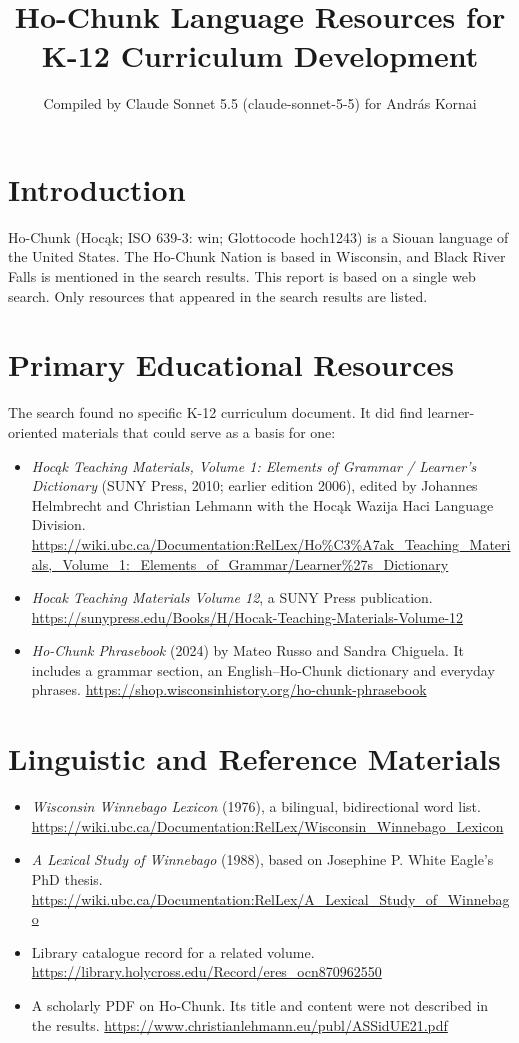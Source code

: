 \documentclass[12pt]{article}
\title{Ho-Chunk Language Resources for K-12 Curriculum Development}
\author{Compiled by Claude Sonnet 5.5 (claude-sonnet-5-5) for Andr\'as Kornai}
\date{}
\begin{document}
\maketitle

\section{Introduction}
Ho-Chunk (Hoc\k{a}k; ISO 639-3: win; Glottocode hoch1243) is a Siouan language of the United States. The Ho-Chunk Nation is based in Wisconsin, and Black River Falls is mentioned in the search results. This report is based on a single web search. Only resources that appeared in the search results are listed.

\section{Primary Educational Resources}
The search found no specific K-12 curriculum document. It did find learner-oriented materials that could serve as a basis for one:
\begin{itemize}
\item \emph{Hoc\k{a}k Teaching Materials, Volume 1: Elements of Grammar / Learner's Dictionary} (SUNY Press, 2010; earlier edition 2006), edited by Johannes Helmbrecht and Christian Lehmann with the Hoc\k{a}k Wazija Haci Language Division. \url{https://wiki.ubc.ca/Documentation:RelLex/Ho%C3%A7ak_Teaching_Materials,_Volume_1:_Elements_of_Grammar/Learner%27s_Dictionary}
\item \emph{Hocak Teaching Materials Volume 12}, a SUNY Press publication. \url{https://sunypress.edu/Books/H/Hocak-Teaching-Materials-Volume-12}
\item \emph{Ho-Chunk Phrasebook} (2024) by Mateo Russo and Sandra Chiguela. It includes a grammar section, an English--Ho-Chunk dictionary and everyday phrases. \url{https://shop.wisconsinhistory.org/ho-chunk-phrasebook}
\end{itemize}

\section{Linguistic and Reference Materials}
\begin{itemize}
\item \emph{Wisconsin Winnebago Lexicon} (1976), a bilingual, bidirectional word list. \url{https://wiki.ubc.ca/Documentation:RelLex/Wisconsin_Winnebago_Lexicon}
\item \emph{A Lexical Study of Winnebago} (1988), based on Josephine P. White Eagle's PhD thesis. \url{https://wiki.ubc.ca/Documentation:RelLex/A_Lexical_Study_of_Winnebago}
\item Library catalogue record for a related volume. \url{https://library.holycross.edu/Record/eres_ocn870962550}
\item A scholarly PDF on Ho-Chunk. Its title and content were not described in the results. \url{https://www.christianlehmann.eu/publ/ASSidUE21.pdf}
\end{itemize}
\end{document}
